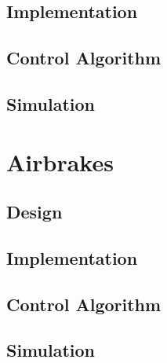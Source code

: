 \documentclass{amsdtx}
\begin{document}
\subsection{Implementation}
\subsection{Control Algorithm}
\subsection{Simulation}
\section{Airbrakes}
\subsection{Design}
\subsection{Implementation}
\subsection{Control Algorithm}
\subsection{Simulation}
\end{document}
